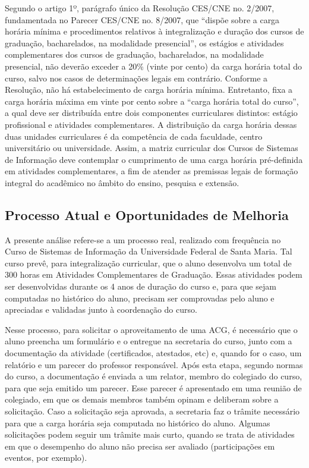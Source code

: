 \documentclass[12pt]{article}
\begin{document}
Segundo o artigo 1º, parágrafo único da Resolução CES/CNE no. 2/2007, fundamentada no Parecer CES/CNE no. 8/2007, que “dispõe sobre a carga horária mínima e procedimentos relativos à integralização e duração dos cursos de graduação, bacharelados, na modalidade presencial”, os estágios e atividades complementares dos cursos de graduação, bacharelados, na modalidade presencial, não deverão exceder a 20\% (vinte por cento) da carga horária total do curso, salvo nos casos de determinações legais em contrário. Conforme a Resolução, não há estabelecimento de carga horária mínima. Entretanto, fixa a carga horária máxima em vinte por cento sobre a “carga horária total do curso”, a qual deve ser distribuída entre dois componentes curriculares distintos: estágio profissional e atividades complementares. A distribuição da carga horária dessas duas unidades curriculares é da competência de cada faculdade, centro universitário ou universidade. Assim, a matriz curricular dos Cursos de Sistemas de Informação deve contemplar o cumprimento de uma carga horária pré-definida em atividades complementares,  a fim de atender  as premissas legais de formação integral do acadêmico no âmbito do ensino, pesquisa e extensão.

\subsection{Processo Atual e Oportunidades de Melhoria}

A presente análise refere-se a um processo real, realizado com frequência no Curso de Sistemas de Informação da Universidade Federal de Santa Maria. Tal curso prevê, para integralização curricular, que o aluno desenvolva um total de 300 horas em Atividades Complementares de Graduação. Essas atividades podem ser desenvolvidas durante os 4 anos de duração do curso e, para que sejam computadas no histórico do aluno, precisam ser comprovadas pelo aluno e apreciadas e validadas junto à coordenação do curso.

Nesse processo, para solicitar o aproveitamento de uma ACG, é necessário que o aluno preencha um formulário e o entregue na secretaria do curso, junto com a documentação da atividade (certificados, atestados, etc) e, quando for o caso, um relatório e um parecer do professor responsável. Após  esta  etapa,  segundo normas do curso, a documentação é enviada a um relator, membro do colegiado do curso, para que seja emitido um parecer. Esse parecer é apresentado em uma reunião de colegiado, em que os demais membros também opinam e deliberam sobre a solicitação. Caso a solicitação seja  aprovada, a secretaria faz o trâmite necessário para que a carga horária seja computada no histórico do aluno. Algumas solicitações podem seguir um trâmite mais curto, quando se trata de atividades em que o desempenho do aluno não precisa ser avaliado (participações em eventos, por exemplo).
\end{document}
